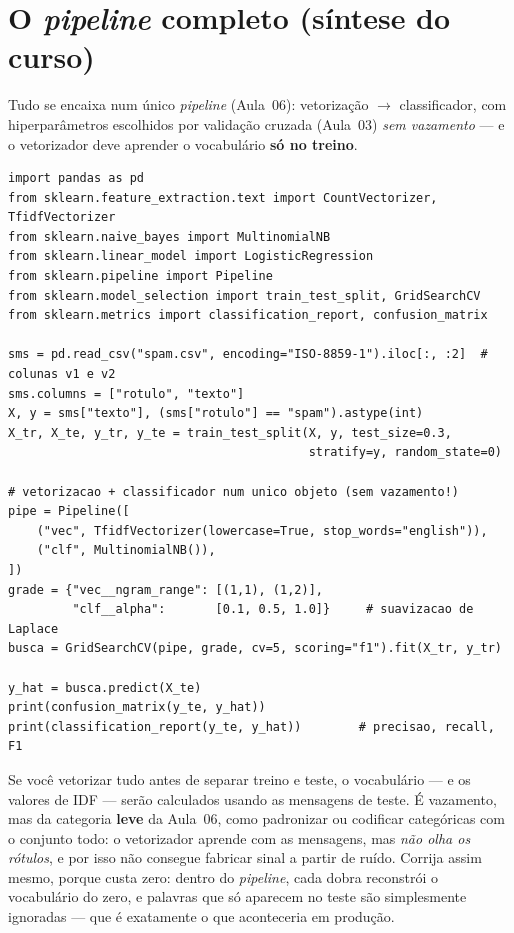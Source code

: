 \documentclass[11pt,a4paper]{article}
\begin{document}
\section{O \emph{pipeline} completo (síntese do curso)}
Tudo se encaixa num único \emph{pipeline} (Aula~06): vetorização $\to$ classificador,
com hiperparâmetros escolhidos por validação cruzada (Aula~03) \emph{sem vazamento}
--- e o vetorizador deve aprender o vocabulário \textbf{só no treino}.

\begin{lstlisting}
import pandas as pd
from sklearn.feature_extraction.text import CountVectorizer, TfidfVectorizer
from sklearn.naive_bayes import MultinomialNB
from sklearn.linear_model import LogisticRegression
from sklearn.pipeline import Pipeline
from sklearn.model_selection import train_test_split, GridSearchCV
from sklearn.metrics import classification_report, confusion_matrix

sms = pd.read_csv("spam.csv", encoding="ISO-8859-1").iloc[:, :2]  # colunas v1 e v2
sms.columns = ["rotulo", "texto"]
X, y = sms["texto"], (sms["rotulo"] == "spam").astype(int)
X_tr, X_te, y_tr, y_te = train_test_split(X, y, test_size=0.3,
                                          stratify=y, random_state=0)

# vetorizacao + classificador num unico objeto (sem vazamento!)
pipe = Pipeline([
    ("vec", TfidfVectorizer(lowercase=True, stop_words="english")),
    ("clf", MultinomialNB()),
])
grade = {"vec__ngram_range": [(1,1), (1,2)],
         "clf__alpha":       [0.1, 0.5, 1.0]}     # suavizacao de Laplace
busca = GridSearchCV(pipe, grade, cv=5, scoring="f1").fit(X_tr, y_tr)

y_hat = busca.predict(X_te)
print(confusion_matrix(y_te, y_hat))
print(classification_report(y_te, y_hat))        # precisao, recall, F1
\end{lstlisting}

\begin{atencao}
Se você vetorizar tudo antes de separar treino e teste, o vocabulário --- e os
valores de IDF --- serão calculados usando as mensagens de teste. É vazamento, mas
da categoria \textbf{leve} da Aula~06, como padronizar ou codificar categóricas com o
conjunto todo: o vetorizador aprende com as mensagens, mas \emph{não olha os rótulos},
e por isso não consegue fabricar sinal a partir de ruído. Corrija assim mesmo, porque
custa zero: dentro do \emph{pipeline}, cada dobra reconstrói o vocabulário do zero, e
palavras que só aparecem no teste são simplesmente ignoradas --- que é exatamente o
que aconteceria em produção.
\end{atencao}
\end{document}

